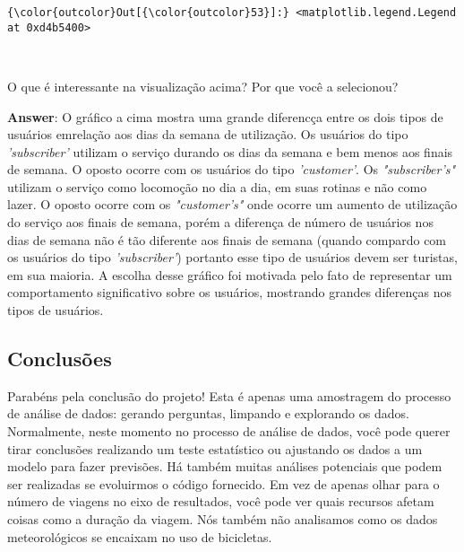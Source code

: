 \documentclass[11pt]{article}
\begin{document}
\begin{Verbatim}[commandchars=\\\{\}]
{\color{outcolor}Out[{\color{outcolor}53}]:} <matplotlib.legend.Legend at 0xd4b5400>
\end{Verbatim}
            
    \begin{center}
    \end{center}
    { \hspace*{\fill} \\}
    
    O que é interessante na visualização acima? Por que você a selecionou?

\textbf{Answer}: O gráfico a cima mostra uma grande diferencça entre os
dois tipos de usuários emrelação aos dias da semana de utilização. Os
usuários do tipo \emph{'subscriber'} utilizam o serviço durando os dias
da semana e bem menos aos finais de semana. O oposto ocorre com os
usuários do tipo \emph{'customer'}. Os \emph{"subscriber's"} utilizam o
serviço como locomoção no dia a dia, em suas rotinas e não como lazer. O
oposto ocorre com os \emph{"customer's"} onde ocorre um aumento de
utilização do serviço aos finais de semana, porém a diferença de número
de usuários nos dias de semana não é tão diferente aos finais de semana
(quando compardo com os usuários do tipo \emph{'subscriber'}) portanto
esse tipo de usuários devem ser turistas, em sua maioria. A escolha
desse gráfico foi motivada pelo fato de representar um comportamento
significativo sobre os usuários, mostrando grandes diferenças nos tipos
de usuários.

    \subsection{Conclusões}\label{conclusuxf5es}

Parabéns pela conclusão do projeto! Esta é apenas uma amostragem do
processo de análise de dados: gerando perguntas, limpando e explorando
os dados. Normalmente, neste momento no processo de análise de dados,
você pode querer tirar conclusões realizando um teste estatístico ou
ajustando os dados a um modelo para fazer previsões. Há também muitas
análises potenciais que podem ser realizadas se evoluirmos o código
fornecido. Em vez de apenas olhar para o número de viagens no eixo de
resultados, você pode ver quais recursos afetam coisas como a duração da
viagem. Nós também não analisamos como os dados meteorológicos se
encaixam no uso de bicicletas.
\end{document}
